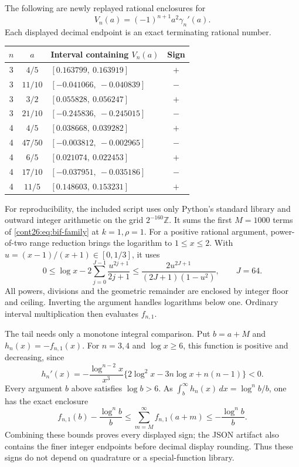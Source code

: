 The following are newly replayed rational enclosures for
\[
 V_n(a)=(-1)^{n+1}a^2\gamma_n'(a).
\]
Each displayed decimal endpoint is an exact terminating rational number.
\begin{center}
\begin{tabular}{cclc}
\hline
$n$&$a$&Interval containing $V_n(a)$&Sign\\
\hline
3&$4/5$&$[0.163799,\ 0.163919]$&$+$\\
3&$11/10$&$[-0.041066,\ -0.040839]$&$-$\\
3&$3/2$&$[0.055828,\ 0.056247]$&$+$\\
3&$21/10$&$[-0.245836,\ -0.245015]$&$-$\\
4&$4/5$&$[0.038668,\ 0.039282]$&$+$\\
4&$47/50$&$[-0.003812,\ -0.002965]$&$-$\\
4&$6/5$&$[0.021074,\ 0.022453]$&$+$\\
4&$17/10$&$[-0.037951,\ -0.035186]$&$-$\\
4&$11/5$&$[0.148603,\ 0.153231]$&$+$\\
\hline
\end{tabular}
\end{center}

For reproducibility, the included script uses only Python's standard
library and outward integer arithmetic on the grid $2^{-160}\mathbb Z$.
It sums the first $M=1000$ terms of \eqref{cont26:eq:bif-family} at $k=1,\rho=1$.
For a positive rational argument, power-of-two range reduction brings
the logarithm to $1\leq x\leq2$. With $u=(x-1)/(x+1)\in[0,1/3]$, it uses
\begin{equation}\label{cont26:eq:bif-log-certificate}
 0\leq\log x-2\sum_{j=0}^{J-1}\frac{u^{2j+1}}{2j+1}
 \leq\frac{2u^{2J+1}}{(2J+1)(1-u^2)},\qquad J=64.
\end{equation}
All powers, divisions and the geometric remainder are enclosed by
integer floor and ceiling. Inverting the argument handles logarithms
below one. Ordinary interval multiplication then evaluates $f_{n,1}$.

The tail needs only a monotone integral comparison. Put $b=a+M$ and
$h_n(x)=-f_{n,1}(x)$. For $n=3,4$ and $\log x\geq6$, this function is
positive and decreasing, since
\[
 h_n'(x)=-\frac{\log^{n-2}x}{x^3}
          \{2\log^2x-3n\log x+n(n-1)\}<0.
\]
Every argument $b$ above satisfies $\log b>6$. As
$\int_b^\infty h_n(x)\,dx=\log^n b/b$, one has the exact enclosure
\begin{equation}\label{cont26:eq:bif-tail-certificate}
 f_{n,1}(b)-\frac{\log^n b}{b}
 \leq\sum_{m=M}^{\infty}f_{n,1}(a+m)
 \leq-\frac{\log^n b}{b}.
\end{equation}
Combining these bounds proves every displayed sign; the JSON artifact
also contains the finer integer endpoints before decimal display rounding.
Thus these signs do not depend on quadrature or a special-function library.

